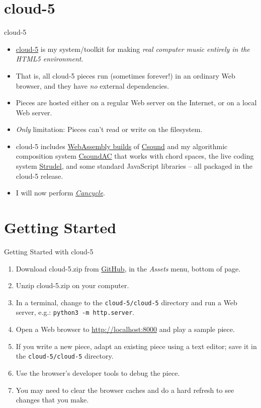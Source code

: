 \documentclass{beamer}
\begin{document}
\section{cloud-5}
\begin{frame}{cloud-5}

\begin{itemize}
\item \href{https://gogins.github.io/cloud-5.html}{cloud-5} is my system/toolkit for making \emph{real computer music entirely in the HTML5 environment}.
\item That is, all cloud-5 pieces run (sometimes forever!) in an ordinary Web browser, and they have \emph{no} external dependencies.
\item Pieces are hosted either on a regular Web server on the Internet, or on a local Web server.
\item \emph{Only} limitation: Pieces can't read or write on the filesystem.
\item cloud-5 includes \href{https://github.com/gogins/csound-wasm}{WebAssembly builds} of \href{http://csound.github.io}{Csound} and my algorithmic composition system \href{https://github.com/gogins/csound-ac}{CsoundAC} that works with chord spaces, the live coding system \href{https://github.com/tidalcycles/strudel}{Strudel}, and some standard JavaScript libraries -- all packaged in the cloud-5 release.
\item I will now perform \href{http://gogins.github.io/cancycle.html}{\emph{Cancycle}}.
\end{itemize}

\end{frame}

\section{Getting Started}
\begin{frame}{Getting Started with cloud-5}

\begin{enumerate}
\item Download cloud-5.zip from \href{https://github.com/gogins/cloud-5/releases}{GitHub}, in the \emph{Assets} menu, bottom of page.
\item Unzip cloud-5.zip on your computer.
\item In a terminal, change to the \texttt{cloud-5/cloud-5} directory and run a Web server, e.g.: \texttt{python3 -m http.server}.
\item Open a Web browser to \url{http://localhost:8000} and play a sample piece.
\item If you write a new piece, adapt an existing piece using a text editor; save it in the  \texttt{cloud-5/cloud-5} directory.
\item Use the browser's developer tools to debug the piece.
\item You may need to clear the browser caches and do a hard refresh to see changes that you make.
\end{enumerate}

\end{frame}
\end{document}
